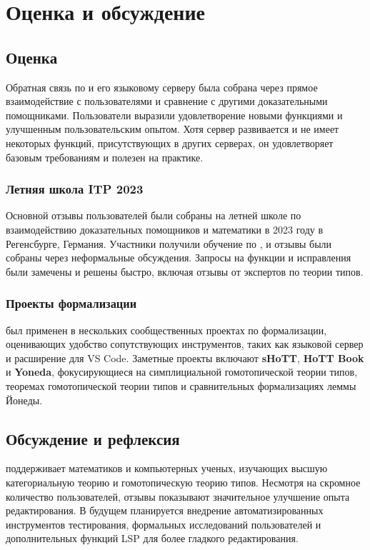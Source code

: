 \chapter{Оценка и обсуждение}
\label{chap:eval}

\section{Оценка}

Обратная связь по \Rzk{} и его языковому серверу была собрана через прямое взаимодействие с пользователями и сравнение с другими доказательными помощниками. Пользователи выразили удовлетворение новыми функциями и улучшенным пользовательским опытом. Хотя сервер развивается и не имеет некоторых функций, присутствующих в других серверах, он удовлетворяет базовым требованиям и полезен на практике.

\subsection{Летняя школа ITP 2023}

Основной отзывы пользователей были собраны на летней школе по взаимодействию доказательных помощников и математики в 2023 году в Регенсбурге, Германия. Участники получили обучение по \Rzk{}, и отзывы были собраны через неформальные обсуждения. Запросы на функции и исправления были замечены и решены быстро, включая отзывы от экспертов по теории типов.

\subsection{Проекты формализации}

\Rzk{} был применен в нескольких сообщественных проектах по формализации, оценивающих удобство сопутствующих инструментов, таких как языковой сервер и расширение для VS Code. Заметные проекты включают \textbf{sHoTT}, \textbf{HoTT Book} и \textbf{Yoneda}, фокусирующиеся на симплициальной гомотопической теории типов, теоремах гомотопической теории типов и сравнительных формализациях леммы Йонеды.

\section{Обсуждение и рефлексия}

\Rzk{} поддерживает математиков и компьютерных ученых, изучающих высшую категориальную теорию и гомотопическую теорию типов. Несмотря на скромное количество пользователей, отзывы показывают значительное улучшение опыта редактирования. В будущем планируется внедрение автоматизированных инструментов тестирования, формальных исследований пользователей и дополнительных функций LSP для более гладкого редактирования.
